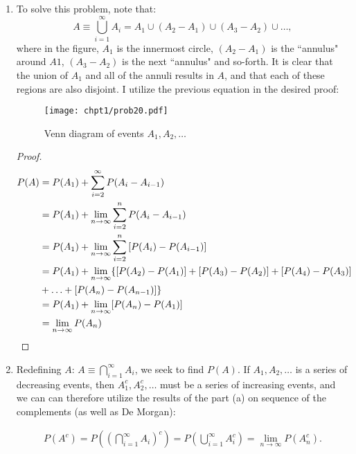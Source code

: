 \begin{problem}{20} $ $

\begin{enumerate}
\item To solve this problem, note that:
	\begin{equation*}
		A\equiv \bigcup_{i=1}^{\infty}A_i = A_1 \cup (A_2-A_1) \cup (A_3-A_2) \cup \ldots, 
	\end{equation*}
where in the figure, $A_1$ is the innermost circle, $(A_2-A_1)$ is the ``annulus" around $A1$, $(A_3-A_2)$ is the next ``annulus" and so-forth.  It is clear that the union of $A_1$ and all of the annuli results in $A$, and that each of these regions are also disjoint.  I utilize the previous equation in the desired proof:
	\begin{figure}[t]
	\centering
      		 \texttt{[image: chpt1/prob20.pdf]}
  			  \caption{Venn diagram of events $A_1, A_2, \ldots$}
    			   \label{fig:prob_20}
	\end{figure}
	
	\begin{proof}
		\begin{align*}
		P(A) & = P(A_1)+\sum_{i=2}^{\infty} P(A_i-A_{i-1}) \\
		& = P(A_1)+\lim_{n \rightarrow \infty} \sum_{i=2}^{n} P(A_i-A_{i-1}) \\
		& = P(A_1)+\lim_{n \rightarrow \infty} \sum_{i=2}^{n} \left [P(A_i)-P(A_{i-1}) \right] \\
		& =  P(A_1)+\lim_{n \rightarrow \infty} \{ [P(A_2)-P(A_1)]+[P(A_3)-P(A_2)]+[P(A_4)-P(A_3)] \\
		& +\ldots +[P(A_n)-P(A_{n-1})]\} \\
		& = P(A_1)+\lim_{n \rightarrow \infty} [P(A_n)-P(A_1)] \\
		& = \lim_{n \rightarrow \infty} P(A_n) \qedhere
		\end{align*}
	\end{proof}
	
	\item Redefining $A$: $A\equiv \bigcap_{i=1}^{\infty}A_i$, we seek to find $P(A)$. If $A_1, A_2, \ldots$ is a series of decreasing events, then $A_1^c, A_2^c, \ldots$ must be a series of increasing events, and we can can therefore utilize the results of the part (a) on sequence of the complements (as well as De Morgan):
	
	\begin{align*}
		P(A^c) = P\left(\left(\bigcap_{i=1}^{\infty}A_i\right)^c\right)=P\left(\bigcup_{i=1}^{\infty}A_i^c\right) = \lim_{n \rightarrow \infty}P(A_n^c).
	\end{align*}
	

\end{enumerate}
\end{problem}
